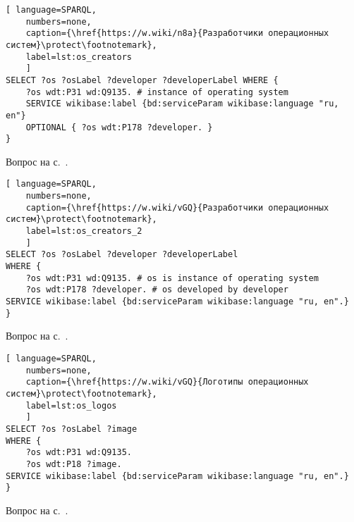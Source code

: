\begin{task}
	\label{answer:what_system_created}

\begin{lstlisting}[ language=SPARQL, 
    numbers=none,
    caption={\href{https://w.wiki/n8a}{Разработчики операционных систем}\protect\footnotemark},
	label=lst:os_creators
	]
SELECT ?os ?osLabel ?developer ?developerLabel WHERE {
	?os wdt:P31 wd:Q9135. # instance of operating system
	SERVICE wikibase:label {bd:serviceParam wikibase:language "ru, en"}
	OPTIONAL { ?os wdt:P178 ?developer. }
}\end{lstlisting}

\small{Вопрос на с.~\pageref{lst:inception_time_of_operating_systems}.}
\end{task}

\begin{task}
	\label{answer:os_and_developers}

\begin{lstlisting}[ language=SPARQL, 
    numbers=none,
    caption={\href{https://w.wiki/vGQ}{Разработчики операционных систем}\protect\footnotemark},
    label=lst:os_creators_2
	]
SELECT ?os ?osLabel ?developer ?developerLabel
WHERE {
	?os wdt:P31 wd:Q9135. # os is instance of operating system
	?os wdt:P178 ?developer. # os developed by developer
SERVICE wikibase:label {bd:serviceParam wikibase:language "ru, en".}
}\end{lstlisting}

\small{Вопрос на с.~\pageref{tasks:operating_system_tasks}.}
\end{task}

\begin{task}
\label{answer:os_and_logos}

\begin{lstlisting}[ language=SPARQL, 
    numbers=none,
    caption={\href{https://w.wiki/vGQ}{Логотипы операционных систем}\protect\footnotemark},
    label=lst:os_logos
	]
SELECT ?os ?osLabel ?image
WHERE {
	?os wdt:P31 wd:Q9135.
	?os wdt:P18 ?image.
SERVICE wikibase:label {bd:serviceParam wikibase:language "ru, en".}
}\end{lstlisting}

\small{Вопрос на с.~\pageref{tasks:operating_system_tasks}.}
\end{task}

